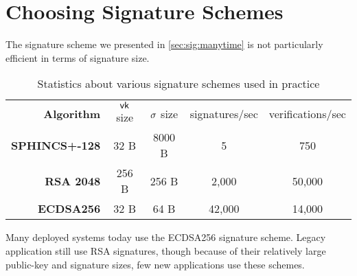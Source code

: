 \section{Choosing Signature Schemes}
The signature scheme we presented in \cref{sec:sig:manytime}
is not particularly efficient in terms of signature size.

\begin{table}[htpb]
	\centering
	\caption{Statistics about various signature schemes used in practice}
	\label{tab:sig_schemes}

	\begin{tabular}{rcccc}
		\textbf{Algorithm} & $\mathsf{vk}$ size & $\sigma$ size & signatures/sec & verifications/sec \\
		\bf{SPHINCS+-128} & 32 B & 8000 B & 5 & 750 \\
		\bf{RSA 2048} & 256 B & 256 B & 2,000 & 50,000 \\
		\bf{ECDSA256} & 32 B & 64 B & 42,000 & 14,000 \\
	\end{tabular}
\end{table}

Many deployed systems today use the ECDSA256 signature scheme.
Legacy application still use RSA signatures, though because of their
relatively large public-key and signature sizes, few new applications
use these schemes.
